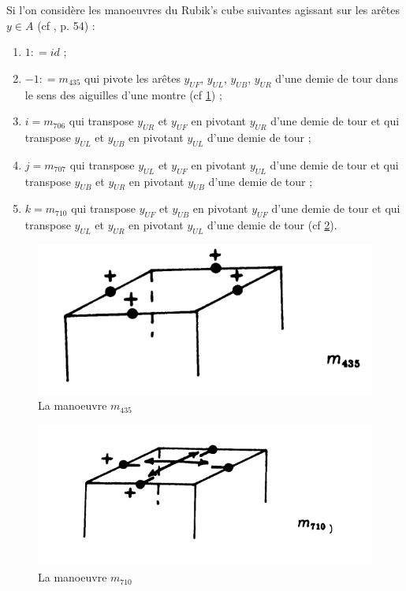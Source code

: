 \documentclass[french]{report}
\begin{document}
Si l'on considère les manoeuvres du Rubik's cube suivantes agissant sur les arêtes $y \in A$ (cf \cite{bandelow}, p. 54) :

\begin{enumerate}
  \item $1 : = id$ ;
  \item $-1: = m _{435}$ qui pivote les arêtes $y _{UF}$, $y _{UL}$, $y _{UB}$, $y _{UR}$ d'une demie de tour dans le sens des aiguilles d'une montre (cf \ref{m435}) ;
  \item $i = m _{706}$ qui transpose $y _{UR}$ et $y _{UF}$ en pivotant $y _{UR}$ d'une demie de tour et qui transpose $y _{UL}$ et $y _{UB}$ en pivotant $ y _{UL}$ d'une demie de tour ;
  \item $j = m _{707}$ qui transpose $y _{UL}$ et $y _{UF}$ en pivotant $y _{UL}$ d'une demie de tour et qui transpose $y _{UB}$ et $ y _{UR}$ en pivotant $ y _{UB}$ d'une demie de tour ;
  \item $k = m _{710}$ qui transpose $y _{UF}$ et $y _{UB}$ en pivotant $y _{UF}$ d'une demie de tour et qui transpose $y _{UL}$ et $y _{UR}$ en pivotant $ y _{UL}$ d'une demie de tour (cf \ref{m710}).
\end{enumerate}

\begin{figure}[h!]
  \centering
  \includegraphics[scale=0.3]{figures/m435.png}
  \caption{La manoeuvre $m _{435}$}
  \label{m435}
\end{figure}

\begin{figure}[h!]
  \centering
  \includegraphics[scale=0.3]{figures/m710.png}
  \caption{La manoeuvre $m _{710}$}
  \label{m710}
\end{figure}
\end{document}
